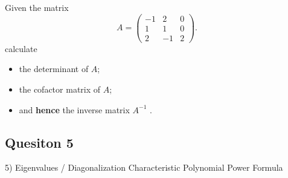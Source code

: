 \documentclass[12pt,a4paper]{article}
\begin{document}
 Given the  matrix 
\begin{equation*}
A=\left( \begin{array}{rrr}
-1 & 2 & 0\\
1 & 1 & 0\\
2 & -1 & 2
\end{array} \right).
\end{equation*}
calculate
\begin{itemize}
\item the determinant of $A$;
\item the cofactor matrix of $A$;
\item and {\bf hence} the inverse matrix $A^{-1}$ .
\end{itemize}
\subsection*{Quesiton 5}
5) Eigenvalues / Diagonalization
	Characteristic Polynomial
	Power Formula
\end{document}
